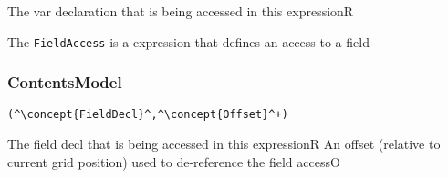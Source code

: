 \begin{HIRAttributes}
	{The var declaration that is being accessed in this expression}{R}
\end{HIRAttributes}

The {\tt FieldAccess} is a expression that defines an access to a field

\subsubsection*{ContentsModel}{}

\begin{lstlisting}[style=default,frame=none]
(^\concept{FieldDecl}^,^\concept{Offset}^+)
\end{lstlisting}

\begin{HIRChildElements}
	{The field decl that is being accessed in this expression}{R}
	{An offset (relative to current grid position) used to de-reference the field access}{O}
\end{HIRChildElements}
